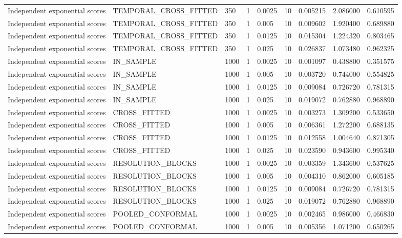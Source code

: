 \begin{tabular}{lllllllll}
Independent exponential scores & TEMPORAL\_CROSS\_FITTED & 350 & 1 & 0.0025 & 10 & 0.005215 & 2.086000 & 0.610595 \\
Independent exponential scores & TEMPORAL\_CROSS\_FITTED & 350 & 1 & 0.005 & 10 & 0.009602 & 1.920400 & 0.689880 \\
Independent exponential scores & TEMPORAL\_CROSS\_FITTED & 350 & 1 & 0.0125 & 10 & 0.015304 & 1.224320 & 0.803465 \\
Independent exponential scores & TEMPORAL\_CROSS\_FITTED & 350 & 1 & 0.025 & 10 & 0.026837 & 1.073480 & 0.962325 \\
Independent exponential scores & IN\_SAMPLE & 1000 & 1 & 0.0025 & 10 & 0.001097 & 0.438800 & 0.351575 \\
Independent exponential scores & IN\_SAMPLE & 1000 & 1 & 0.005 & 10 & 0.003720 & 0.744000 & 0.554825 \\
Independent exponential scores & IN\_SAMPLE & 1000 & 1 & 0.0125 & 10 & 0.009084 & 0.726720 & 0.781315 \\
Independent exponential scores & IN\_SAMPLE & 1000 & 1 & 0.025 & 10 & 0.019072 & 0.762880 & 0.968890 \\
Independent exponential scores & CROSS\_FITTED & 1000 & 1 & 0.0025 & 10 & 0.003273 & 1.309200 & 0.533650 \\
Independent exponential scores & CROSS\_FITTED & 1000 & 1 & 0.005 & 10 & 0.006361 & 1.272200 & 0.688135 \\
Independent exponential scores & CROSS\_FITTED & 1000 & 1 & 0.0125 & 10 & 0.012558 & 1.004640 & 0.871305 \\
Independent exponential scores & CROSS\_FITTED & 1000 & 1 & 0.025 & 10 & 0.023590 & 0.943600 & 0.995340 \\
Independent exponential scores & RESOLUTION\_BLOCKS & 1000 & 1 & 0.0025 & 10 & 0.003359 & 1.343600 & 0.537625 \\
Independent exponential scores & RESOLUTION\_BLOCKS & 1000 & 1 & 0.005 & 10 & 0.004310 & 0.862000 & 0.605185 \\
Independent exponential scores & RESOLUTION\_BLOCKS & 1000 & 1 & 0.0125 & 10 & 0.009084 & 0.726720 & 0.781315 \\
Independent exponential scores & RESOLUTION\_BLOCKS & 1000 & 1 & 0.025 & 10 & 0.019072 & 0.762880 & 0.968890 \\
Independent exponential scores & POOLED\_CONFORMAL & 1000 & 1 & 0.0025 & 10 & 0.002465 & 0.986000 & 0.466830 \\
Independent exponential scores & POOLED\_CONFORMAL & 1000 & 1 & 0.005 & 10 & 0.005356 & 1.071200 & 0.650265 \\

\end{tabular}

